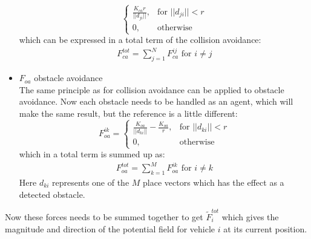 \begin{itemize}
\[\begin{cases}
    \frac{K_{ca}r}{||d_{ji}||},& \text{for } ||d_{ji}||<r\\
    0,              & \text{otherwise}
\end{cases}
\]
which can be expressed in a total term of the collision avoidance:
\begin{align}
F_{ca}^{tot} = \sum\limits_{j=1}^NF_{ca}^{ij} \text{ for } i\neq j
\end{align}
\item $F_{oa}$ obstacle avoidance\\
The same principle as for collision avoidance can be applied to obstacle avoidance. Now each obstacle needs to be handled as an agent, which will make the same result, but the reference is a little different:
\[
    F_{oa}^{ik}= 
\begin{cases}
    \frac{K_{oa}}{||d_{ki}||}-\frac{K_{oa}}{r},& \text{for } ||d_{ki}||<r\\
    0,              & \text{otherwise}
\end{cases}
\]
which in a total term is summed up as:
\begin{align}
F_{oa}^{tot} = \sum\limits_{k=1}^MF_{oa}^{ik} \text{ for } i\neq k
\end{align}
Here $d_{ki}$ represents one of the $M$ place vectors which has the effect as a detected obstacle.
\end{itemize}
Now these forces needs to be summed together to get $\tilde{F}_i^{tot}$ which gives the magnitude and direction of the potential field for vehicle $i$ at its current position.
